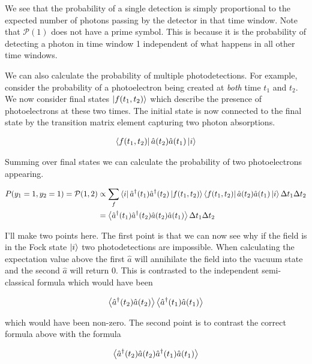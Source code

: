 \documentclass[12pt]{article}
\begin{document}
We see that the probability of a single detection is simply proportional to the expected number of photons passing by the detector in that time window. Note that $\mathcal{P}(1)$ does not have a prime symbol. This is because it is the probability of detecting a photon in time window 1 independent of what happens in all other time windows.

We can also calculate the probability of multiple photodetections. For example, consider the probability of a photoelectron being created at \textit{both} time $t_1$ and $t_2$. We now consider final states $\ket{f(t_1,t_2)}$ which describe the presence of photoelectrons at these two times. The initial state is now connected to the final state by the transition matrix element capturing two photon absorptions.

\begin{align}
\bra{f(t_1,t_2)}\hat{a}(t_2)\hat{a}(t_1)\ket{i}
\end{align}

Summing over final states we can calculate the probability of two photoelectrons appearing.

\begin{align}
P(y_1=1,y_2=1) = \mathcal{P}(1,2) &\propto \sum_{f}\bra{i}\hat{a}^{\dag}(t_1)\hat{a}^{\dag}(t_2)\ket{f(t_1,t_2)}\bra{f(t_1,t_2)}\hat{a}(t_2)\hat{a}(t_1)\ket{i}\Delta t_1 \Delta t_2\\
&= \Braket{\hat{a}^{\dag}(t_1)\hat{a}^{\dag}(t_2)\hat{a}(t_2)\hat{a}(t_1)}\Delta t_1 \Delta t_2
\end{align}

I'll make two points here. The first point is that we can now see why if the field is in the Fock state $\ket{i}$ two photodetections are impossible. When calculating the expectation value above the first $\hat{a}$ will annihilate the field into the vacuum state and the second $\hat{a}$ will return 0. This is contrasted to the independent semi-classical formula which would have been

\begin{align}
\Braket{\hat{a}^{\dag}(t_2) \hat{a}(t_2)} \Braket{\hat{a}^{\dag}(t_1) \hat{a}(t_1)}
\end{align}

which would have been non-zero. The second point is to contrast the correct formula above with the formula

\begin{align}
\Braket{\hat{a}^{\dag}(t_2)\hat{a}(t_2) \hat{a}^{\dag}(t_1)\hat{a}(t_1)}
\end{align}
\end{document}
